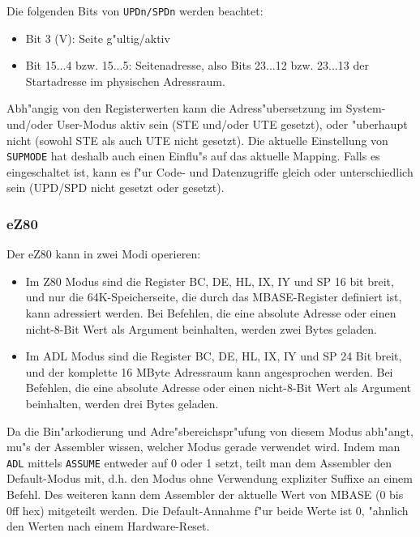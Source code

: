 \documentclass[12pt,a4paper,twoside]{report}
\begin{document}
Die folgenden Bits von {\tt UPDn/SPDn} werden beachtet:
\begin{itemize}
\item{Bit 3 (V): Seite g"ultig/aktiv}
\item{Bit 15...4 bzw. 15...5: Seitenadresse, also Bits 23...12
      bzw. 23...13 der Startadresse im physischen Adressraum.}
\end{itemize}

Abh"angig von den Registerwerten kann die Adress"ubersetzung im System-
und/oder User-Modus aktiv sein (STE und/oder UTE gesetzt), oder "uberhaupt
nicht (sowohl STE als auch UTE nicht gesetzt).  Die aktuelle Einstellung
von {\tt SUPMODE} hat deshalb auch einen Einflu"s auf das aktuelle Mapping.
Falls es eingeschaltet ist, kann es f"ur Code- und Datenzugriffe gleich
oder unterschiedlich sein (UPD/SPD nicht gesetzt oder gesetzt).


\subsubsection{eZ80}

Der eZ80 kann in zwei Modi operieren:
\begin{itemize}
\item{Im Z80 Modus sind die Register BC, DE, HL, IX, IY und SP 16 bit breit,
      und nur die 64K-Speicherseite, die durch das MBASE-Register definiert
      ist, kann adressiert werden.  Bei Befehlen, die eine absolute Adresse oder
      einen nicht-8-Bit Wert als Argument beinhalten, werden zwei Bytes
      geladen.}
\item{Im ADL Modus sind die Register BC, DE, HL, IX, IY und SP 24 Bit breit,
      und der komplette 16 MByte Adressraum kann angesprochen werden.  Bei Befehlen,
      die eine absolute Adresse oder einen nicht-8-Bit Wert als Argument beinhalten,
      werden drei Bytes geladen.}
\end{itemize}
Da die Bin"arkodierung und Adre"sbereichspr"ufung von diesem Modus abh"angt,
mu"s der Assembler wissen, welcher Modus gerade verwendet wird.  Indem man
{\tt ADL} mittels {\tt ASSUME} entweder auf 0 oder 1 setzt, teilt man dem
Assembler den Default-Modus mit, d.h. den Modus ohne Verwendung expliziter
Suffixe an einem Befehl.  Des weiteren kann dem Assembler der aktuelle
Wert von MBASE (0 bis 0ff hex) mitgeteilt werden.  Die Default-Annahme
f"ur beide Werte ist 0, "ahnlich den Werten nach einem Hardware-Reset.
\end{document}
